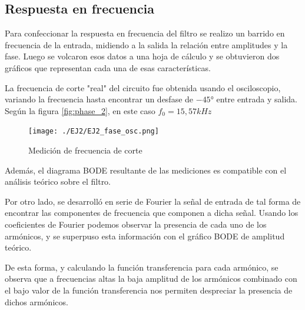 \subsection{Respuesta en frecuencia}

Para confeccionar la respuesta en frecuencia del filtro se realizo un barrido en frecuencia de la entrada, midiendo a la salida la relaci\'on entre amplitudes y la fase. Luego se volcaron esos datos a una hoja de c\'alculo y se obtuvieron dos gr\'aficos que representan cada una de esas caracter\'isticas.




La frecuencia de corte "real" del circuito fue obtenida usando el osciloscopio, variando la frecuencia hasta encontrar un desfase de $-45°$ entre entrada y salida. Seg\'un la figura \ref{fig:phase_2}, en este caso $f_{0}=15,57kHz$


\begin{figure}[H]
    \centering
    \texttt{[image: ./EJ2/EJ2\_fase\_osc.png]}
    \caption{Medici\'on de frecuencia de corte}
    \label{fig: phase_2} 
\end{figure}
Adem\'as, el diagrama BODE resultante de las mediciones es compatible con el an\'alisis te\'orico sobre el filtro.

Por otro lado, se desarroll\'o en serie de Fourier la se\~nal de entrada de tal forma de encontrar las componentes de frecuencia que componen a dicha se\~nal. Usando los coeficientes de Fourier podemos observar la presencia de cada uno de los arm\'onicos, y se superpuso esta informaci\'on con el gr\'afico BODE de amplitud teórico.

De esta forma, y calculando la funci\'on transferencia para cada arm\'onico, se observa que a frecuencias altas la baja amplitud de los arm\'onicos combinado con el bajo valor de la funci\'on transferencia nos permiten despreciar la presencia de dichos arm\'onicos.

